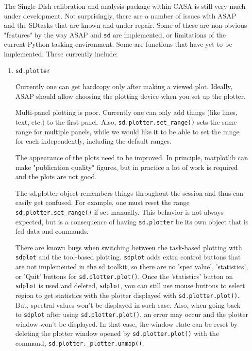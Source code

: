 The Single-Dish calibration and analysis package within CASA is still
very much under development.  Not surprisingly,
there are a number of issues with ASAP and the SDtasks that are known and
under repair.  Some of these are non-obvious "features" by the way
ASAP and {\tt sd} are implemented, or limitations of the current Python
tasking environment.  Some are functions that have yet to be
implemented.  These currently include: 

\begin{enumerate}

\item {\tt sd.plotter}

  Currently one can get hardcopy only after making a viewed plot.
  Ideally, ASAP should allow choosing the plotting device
  when you set up the plotter.

  Multi-panel plotting is poor.  Currently one can only add things
  (like lines, text, etc.) to the first panel.  Also,
  {\tt sd.plotter.set\_range()} sets the same range for multiple panels,
  while we would like it to be able to set the range for each independently,
  including the default ranges.

  The appearance of the plots need to be improved.  In
  principle, matplotlib can make "publication quality" figures, but in
  practice a lot of work is required and the plots 
  are not good.

  The sd.plotter object remembers things throughout the session
  and thus can easily get confused.  For example, one must
  reset the range {\tt sd.plotter.set\_range()} if set
  manually.  This behavior is not always expected, but is a consequence
  of having {\tt sd.plotter} be its own object that is fed data and
  commands.
  
  There are known bugs when switching between the task-based plotting
  with {\tt sdplot} and the tool-based plotting.
  {\tt sdplot} adds extra control buttons that are not implemented
  in the sd toolkit, so there are no 'spec value', 'statistics', or 'Quit' buttons for 
  {\tt sd.plotter.plot()}. Once the
  'statistics' button on {\tt sdplot} is used and deleted, {\tt sdplot}, 
  you can still use mouse buttons to select region to get statistics with
  the plotter displayed with {\tt sd.plotter.plot()}. But, spectral values won't
  be displayed in such case. Also, when going back to {\tt sdplot} 
  after using {\tt sd.plotter.plot()}, an error may occur and the plotter
  window won't be displayed. In that case, the window state can be reset by deleting the plotter window
  opened by {\tt sd.plotter.plot()} with the command, {\tt sd.plotter.\_plotter.unmap()}. 
 

\end{enumerate}
